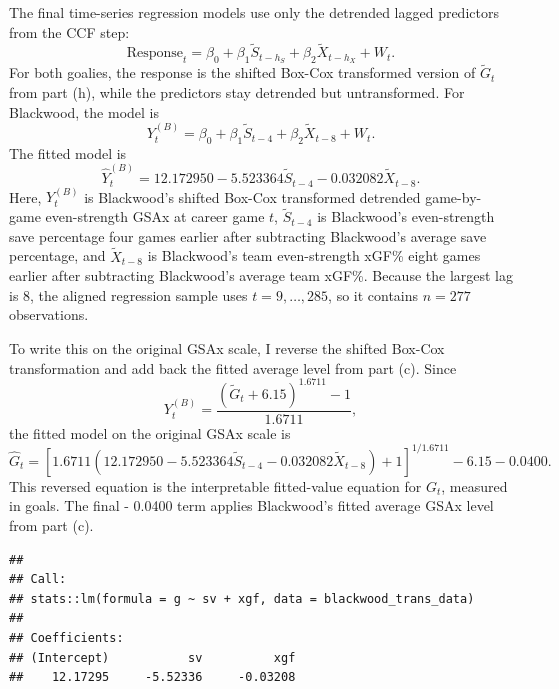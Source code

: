\documentclass[
  10pt,
]{extarticle}
\newenvironment{Shaded}{\begin{snugshade}}{\end{snugshade}}
\newcommand{\FunctionTok}[1]{\textcolor[rgb]{0.13,0.29,0.53}{\textbf{#1}}}
\newcommand{\NormalTok}[1]{#1}
\newcommand{\SpecialCharTok}[1]{\textcolor[rgb]{0.81,0.36,0.00}{\textbf{#1}}}
\begin{document}
The final time-series regression models use only the detrended lagged predictors from the CCF step:
\[
\text{Response}_t = \beta_0 + \beta_1 \tilde{S}_{t-h_S} + \beta_2 \tilde{X}_{t-h_X} + W_t.
\]
For both goalies, the response is the shifted Box-Cox transformed version of \(\tilde{G}_t\) from part (h), while the predictors stay detrended but untransformed. For Blackwood, the model is
\[
Y^{(B)}_t = \beta_0 + \beta_1 \tilde{S}_{t-4} + \beta_2 \tilde{X}_{t-8} + W_t.
\]
The fitted model is
\[
\widehat{Y}^{(B)}_t = 12.172950 - 5.523364 \tilde{S}_{t-4} - 0.032082 \tilde{X}_{t-8}.
\]
Here, \(Y^{(B)}_t\) is Blackwood's shifted Box-Cox transformed detrended game-by-game even-strength GSAx at career game \(t\), \(\tilde{S}_{t-4}\) is Blackwood's even-strength save percentage four games earlier after subtracting Blackwood's average save percentage, and \(\tilde{X}_{t-8}\) is Blackwood's team even-strength xGF\% eight games earlier after subtracting Blackwood's average team xGF\%. Because the largest lag is 8, the aligned regression sample uses \(t = 9,\ldots,285\), so it contains \(n=277\) observations.

To write this on the original GSAx scale, I reverse the shifted Box-Cox transformation and add back the fitted average level from part (c). Since
\[
Y^{(B)}_t
= \frac{\left(\tilde{G}_t + 6.15\right)^{1.6711} - 1}{1.6711},
\]
the fitted model on the original GSAx scale is
\[
\widehat{G}_t
=
\left[
1.6711
\left(12.172950 - 5.523364 \tilde{S}_{t-4} - 0.032082 \tilde{X}_{t-8}\right)
+ 1
\right]^{1/1.6711}
- 6.15
- 0.0400.
\]
This reversed equation is the interpretable fitted-value equation for \(G_t\), measured in goals. The final - 0.0400 term applies Blackwood's fitted average GSAx level from part (c).

\begin{Shaded}
\end{Shaded}

\begin{verbatim}
## 
## Call:
## stats::lm(formula = g ~ sv + xgf, data = blackwood_trans_data)
## 
## Coefficients:
## (Intercept)           sv          xgf  
##    12.17295     -5.52336     -0.03208
\end{verbatim}

\begin{Shaded}
\end{Shaded}
\end{document}

